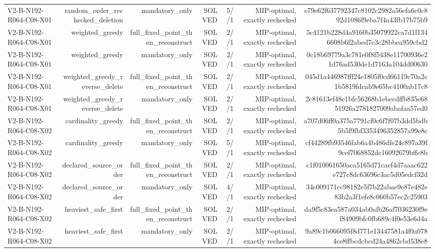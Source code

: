 {\begin{longtable}{lrrrrrr}
V2-B-N192-R064-C08-X01 & random\_order\_rechecked\_deletion & mandatory\_only & SOLVED & 5//1 & MIP-optimal, exactly rechecked & e79e62f637792347c8102c2982a56efa6c0c892d1086f9eba7f4a43fb17b75b9 \\
V2-B-N192-R064-C08-X01 & weighted\_greedy & full\_fixed\_point\_then\_reconstruct & SOLVED & 2//1 & MIP-optimal, exactly rechecked & 5c4121b228d4a9160b35079922ca7d1f1346608b6f2abed7c3c28bbea959cbd2 \\
V2-B-N192-R064-C08-X01 & weighted\_greedy & mandatory\_only & SOLVED & 2//1 & MIP-optimal, exactly rechecked & 0c18b69779a3c781e0f8f5438e11700936e21d76ad530de1d7163a104dd00630 \\
V2-B-N192-R064-C08-X01 & weighted\_greedy\_reverse\_delete & full\_fixed\_point\_then\_reconstruct & SOLVED & 2//1 & MIP-optimal, exactly rechecked & 045d1a446987fff24e1805f0cd66119c70a2c1b5819fdcab9e65bc4100ab17c8 \\
V2-B-N192-R064-C08-X01 & weighted\_greedy\_reverse\_delete & mandatory\_only & SOLVED & 2//1 & MIP-optimal, exactly rechecked & 2c81613ef48e1bfc56268b1ebccdffb835e6851926a2781827009abafaa57ed0 \\
V2-B-N192-R064-C08-X02 & cardinality\_greedy & full\_fixed\_point\_then\_reconstruct & SOLVED & 2//1 & MIP-optimal, exactly rechecked & a707d06ff0a375a7791cf0c6f7f07b3dd5bdb5b5f9fbf3353496352857a99e8c \\
V2-B-N192-R064-C08-X02 & cardinality\_greedy & mandatory\_only & SOLVED & 5//1 & MIP-optimal, exactly rechecked & cf44289fb93546fab6a4b486dfe24c897a39f9cef7068852dc16092679bffe8b \\
V2-B-N192-R064-C08-X02 & declared\_source\_order & full\_fixed\_point\_then\_reconstruct & SOLVED & 2//1 & MIP-optimal, exactly rechecked & c1f010061650aca5165d71caef4d7aaac622e727c8dc63696c3ac5d05edcf32d \\
V2-B-N192-R064-C08-X02 & declared\_source\_order & mandatory\_only & SOLVED & 4//1 & MIP-optimal, exactly rechecked & 34c009171cc98182e5f7b22abae9e87e482e83b2a3f1efe8c060b57ec2c25903 \\
V2-B-N192-R064-C08-X02 & heaviest\_safe\_first & full\_fixed\_point\_then\_reconstruct & SOLVED & 2//1 & MIP-optimal, exactly rechecked & da9f5c83ea587a034ab0afb26af7036230f9ef84909bfc0fb689c4f0e53e6d4a \\
V2-B-N192-R064-C08-X02 & heaviest\_safe\_first & mandatory\_only & SOLVED & 2//1 & MIP-optimal, exactly rechecked & 9a89c1b066095f8d771e13447581a4f0a0784ce8ffbcdcbcd24a4862cbd538e8 \\

\end{longtable}}

